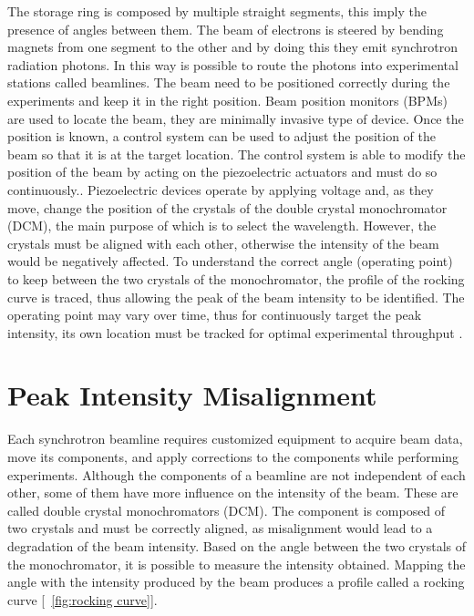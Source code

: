 The storage ring is composed by multiple straight segments, this imply the presence of angles between them.
The beam of electrons is steered by bending magnets from one segment to the other and by doing this they emit synchrotron radiation photons.
In this way is possible to route the photons into experimental stations called beamlines.
The beam need to be positioned correctly during the experiments and keep it in the right position.
Beam position monitors (BPMs) are used to locate the beam, they are minimally invasive type of device.
Once the position is known, a control system can be used to adjust the position of the beam so that it is at the target location.
The control system is able to modify the position of the beam by acting on the piezoelectric actuators and must do so continuously.\cite{Proux2006,Stoupin2010}.
Piezoelectric devices operate by applying voltage and, as they move, change the position of the crystals of the double crystal monochromator (DCM), the main purpose of which is to select the wavelength.
However, the crystals must be aligned with each other, otherwise the intensity of the beam would be negatively affected.
To understand the correct angle (operating point) to keep between the two crystals of the monochromator, the profile of the rocking curve is traced, thus allowing the peak of the beam intensity to be identified.
The operating point may vary over time, thus for continuously target the peak intensity, its own location must be tracked  for optimal experimental throughput \cite{vanSilfhout2014,Quinn2021}. 

\section{Peak Intensity Misalignment}

Each synchrotron beamline requires customized equipment to acquire beam data, move its components, and apply corrections to the components while performing experiments.
Although the components of a beamline are not independent of each other, some of them have more influence on the intensity of the beam.
These are called double crystal monochromators (DCM). 
The component is composed of two crystals and must be correctly aligned, as misalignment would lead to a degradation of the beam intensity.
Based on the angle between the two crystals of the monochromator, it is possible to measure the intensity obtained. Mapping the angle with the intensity produced by the beam produces a profile called a rocking curve [~\ref{fig:rocking curve}].

